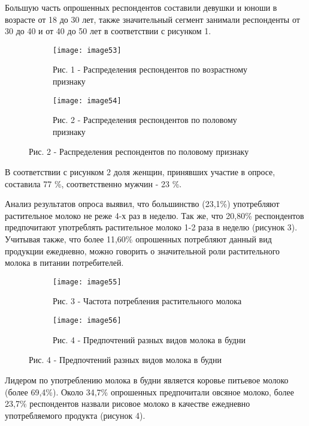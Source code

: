 \begin{multicols}{2}
Большую часть опрошенных респондентов составили девушки и юноши в
возрасте от 18 до 30 лет, также значительный сегмент занимали
респонденты от 30 до 40 и от 40 до 50 лет в соответствии с рисунком 1.
\end{multicols}

\begin{figure}[htbp]
\begin{subfigure}[b]{0.45\textwidth}
\centering
\texttt{[image: image53]}
\caption*{Рис. 1 - Распределения респондентов по возрастному признаку}
\end{subfigure}
\hspace{0.05\textwidth}
\begin{subfigure}[b]{0.45\textwidth}
\centering
\texttt{[image: image54]}
\caption*{Рис. 2 - Распределения респондентов по половому признаку}
\end{subfigure}
\end{figure}

В соответствии с рисунком 2 доля женщин, принявших участие в опросе,
составила 77 \%, соответственно мужчин - 23 \%.

Анализ результатов опроса выявил, что большинство (23,1\%) употребляют
растительное молоко не реже 4-х раз в неделю. Так же, что 20,80\%
респондентов предпочитают употреблять растительное молоко 1-2 раза в
неделю (рисунок 3). Учитывая также, что более 11,60\% опрошенных
потребляют данный вид продукции ежедневно, можно говорить о значительной
роли растительного молока в питании потребителей.

\begin{figure}[htbp]
\begin{subfigure}[b]{0.45\textwidth}
\centering
\texttt{[image: image55]}
\caption*{Рис. 3 - Частота потребления растительного молока}
\end{subfigure}
\hspace{0.05\textwidth}
\begin{subfigure}[b]{0.45\textwidth}
\centering
\texttt{[image: image56]}
\caption*{Рис. 4 - Предпочтений разных видов молока в будни}
\end{subfigure}
\end{figure}

Лидером по употреблению молока в будни является коровье питьевое молоко
(более 69,4\%). Около 34,7\% опрошенных предпочитали овсяное молоко,
более 23,7\% респондентов назвали рисовое молоко в качестве ежедневно
употребляемого продукта (рисунок 4).

